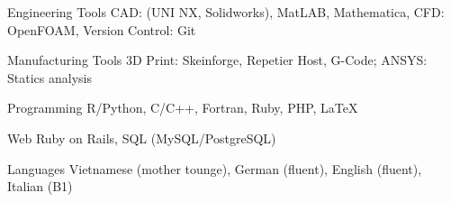 

\begin{cvskills}

  \cvskill
    {Engineering Tools} %
    {CAD: (UNI NX, Solidworks), MatLAB, Mathematica, CFD: OpenFOAM, Version Control: Git} %

  \cvskill
    {Manufacturing Tools} %
    {3D Print: Skeinforge, Repetier Host, G-Code; ANSYS: Statics analysis} %

  \cvskill
    {Programming} %
    {R/Python, C/C++, Fortran, Ruby, PHP, LaTeX} %

  \cvskill
    {Web} %
    {Ruby on Rails, SQL (MySQL/PostgreSQL)} %

  \cvskill
    {Languages} %
    {Vietnamese (mother tounge), German (fluent), English (fluent), Italian (B1)} %

\end{cvskills}
